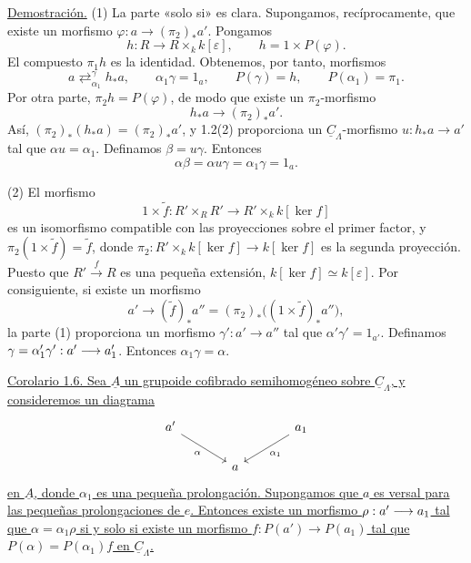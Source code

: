 \underline{Demostración.} (1) La parte «solo si» es clara. Supongamos,
recíprocamente, que existe un morfismo
$\varphi:a\longrightarrow(\pi_2)_*a'$. Pongamos
\[
 h:R\longrightarrow R\times_k k[\varepsilon],
 \qquad h=1\times P(\varphi).
\]
El compuesto $\pi_1h$ es la identidad. Obtenemos, por tanto, morfismos
\[
 a\mathrel{\mathop{\rightleftarrows}^{\gamma}_{\alpha_1}}h_*a,
 \qquad \alpha_1\gamma=1_a,
 \qquad P(\gamma)=h,
 \qquad P(\alpha_1)=\pi_1.
\]
Por otra parte, $\pi_2h=P(\varphi)$, de modo que existe un
$\pi_2$-morfismo
\[
 h_*a\longrightarrow(\pi_2)_*a'.
\]
Así, $(\pi_2)_*(h_*a)=(\pi_2)_*a'$, y 1.2(2) proporciona un
$\underline C_\Lambda$-morfismo $u:h_*a\longrightarrow a'$ tal que
$\alpha u=\alpha_1$. Definamos $\beta=u\gamma$. Entonces
\[
 \alpha\beta=\alpha u\gamma=\alpha_1\gamma=1_a.
\]

(2) El morfismo
\[
 1\times\widetilde f:R'\times_RR'
 \longrightarrow R'\times_k k[\ker f]
\]
es un isomorfismo compatible con las proyecciones sobre el primer
factor, y $\pi_2(1\times\widetilde f)=\widetilde f$, donde
$\pi_2:R'\times_k k[\ker f]\longrightarrow k[\ker f]$ es la segunda
proyección. Puesto que $R'\xrightarrow fR$ es una pequeña extensión,
$k[\ker f]\simeq k[\varepsilon]$. Por consiguiente, si existe un
morfismo
\[
 a'\longrightarrow(\widetilde f)_*a''
   =(\pi_2)_*\bigl((1\times\widetilde f)_*a''\bigr),
\]
la parte (1) proporciona un morfismo $\gamma':a'\longrightarrow a''$
tal que $\alpha'\gamma'=1_{a'}$. Definamos
$\gamma=\alpha'_1\gamma':a'\longrightarrow \sisi{a'}{a'_1}$. Entonces
$\alpha_1\gamma=\alpha$.


\underline{Corolario 1.6. Sea $\underline A$ un grupoide cofibrado
semihomogéneo sobre $\underline C_\Lambda$, y consideremos un diagrama}
\[
\begin{tikzcd}[column sep=large]
a' \arrow[dr,"\alpha"'] & & a_1 \arrow[dl,"\alpha_1"] \\
& a &
\end{tikzcd}
\]
\underline{en $\underline A$, donde $\alpha_1$ es una pequeña
prolongación. Supongamos que $a$ es versal para las pequeñas
prolongaciones de $e$. Entonces existe un morfismo
$\rho:a'\sisi{\relbar\joinrel\relbar\joinrel\relbar}{\longrightarrow} a_1$ tal que $\alpha=\alpha_1\rho$ si y solo
si existe un morfismo $f:P(a')\longrightarrow P(a_1)$ tal que
$P(\alpha)=P(\alpha_1)f$ en $\underline C_\Lambda$.}

